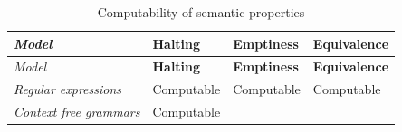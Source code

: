 \begin{longtable}[]{@{}llll@{}}
\caption{Computability of semantic properties}\tabularnewline
\toprule
\begin{minipage}[b]{0.31\columnwidth}\raggedright
\emph{Model}\strut
\end{minipage} & \begin{minipage}[b]{0.17\columnwidth}\raggedright
\textbf{Halting}\strut
\end{minipage} & \begin{minipage}[b]{0.19\columnwidth}\raggedright
\textbf{Emptiness}\strut
\end{minipage} & \begin{minipage}[b]{0.21\columnwidth}\raggedright
\textbf{Equivalence}\strut
\end{minipage}\tabularnewline
\midrule
\endfirsthead
\toprule
\begin{minipage}[b]{0.31\columnwidth}\raggedright
\emph{Model}\strut
\end{minipage} & \begin{minipage}[b]{0.17\columnwidth}\raggedright
\textbf{Halting}\strut
\end{minipage} & \begin{minipage}[b]{0.19\columnwidth}\raggedright
\textbf{Emptiness}\strut
\end{minipage} & \begin{minipage}[b]{0.21\columnwidth}\raggedright
\textbf{Equivalence}\strut
\end{minipage}\tabularnewline
\midrule
\endhead
\begin{minipage}[t]{0.31\columnwidth}\raggedright
\emph{Regular expressions}\strut
\end{minipage} & \begin{minipage}[t]{0.17\columnwidth}\raggedright
Computable\strut
\end{minipage} & \begin{minipage}[t]{0.19\columnwidth}\raggedright
Computable\strut
\end{minipage} & \begin{minipage}[t]{0.21\columnwidth}\raggedright
Computable\strut
\end{minipage}\tabularnewline
\begin{minipage}[t]{0.31\columnwidth}\raggedright
\emph{Context free grammars}\strut
\end{minipage} & \begin{minipage}[t]{0.17\columnwidth}\raggedright
Computable\strut
\end{minipage} & \begin{minipage}[t]{0.19\columnwidth}\raggedright

\end{minipage}
\end{longtable}
